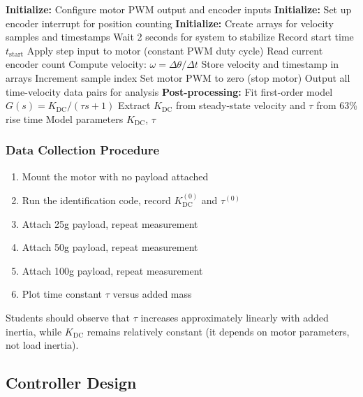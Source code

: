 \begin{algorithm}
\caption{System Identification via Step Response}
\label{alg:sysid}
\begin{algorithmic}[1]
\State \textbf{Initialize:} Configure motor PWM output and encoder inputs
\State \textbf{Initialize:} Set up encoder interrupt for position counting
\State \textbf{Initialize:} Create arrays for velocity samples and timestamps
\State Wait 2 seconds for system to stabilize
\State Record start time $t_{\text{start}}$
\State Apply step input to motor (constant PWM duty cycle)
        \State Read current encoder count
        \State Compute velocity: $\omega = \Delta\theta / \Delta t$
        \State Store velocity and timestamp in arrays
        \State Increment sample index
    \EndIf
\EndWhile
\State Set motor PWM to zero (stop motor)
\State Output all time-velocity data pairs for analysis
\State \textbf{Post-processing:} Fit first-order model $G(s) = K_{\text{DC}}/(\tau s + 1)$
\State Extract $K_{\text{DC}}$ from steady-state velocity and $\tau$ from 63\% rise time
\State \Return Model parameters $K_{\text{DC}}$, $\tau$
\end{algorithmic}
\end{algorithm}

\subsubsection{Data Collection Procedure}

\begin{enumerate}
    \item Mount the motor with no payload attached
    \item Run the identification code, record $K_{\text{DC}}^{(0)}$ and $\tau^{(0)}$
    \item Attach 25g payload, repeat measurement
    \item Attach 50g payload, repeat measurement
    \item Attach 100g payload, repeat measurement
    \item Plot time constant $\tau$ versus added mass
\end{enumerate}

Students should observe that $\tau$ increases approximately linearly with added inertia, while $K_{\text{DC}}$ remains relatively constant (it depends on motor parameters, not load inertia).

\subsection{Controller Design}

